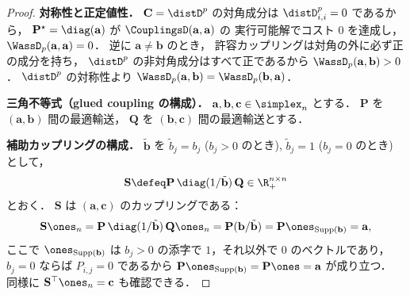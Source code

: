 \begin{proof}
  \textbf{対称性と正定値性．}
  $\mathbf{C} = \distD^p$ の対角成分は $\distD_{i,i}^p = 0$ であるから，
  $\mathbf{P}^\star = \diag(\mathbf{a})$ が $\CouplingsD(\mathbf{a}, \mathbf{a})$ の
  実行可能解でコスト $0$ を達成し，$\WassD_p(\mathbf{a}, \mathbf{a}) = 0$．
  逆に $\mathbf{a} \neq \mathbf{b}$ のとき，
  許容カップリングは対角の外に必ず正の成分を持ち，
  $\distD^p$ の非対角成分はすべて正であるから $\WassD_p(\mathbf{a}, \mathbf{b}) > 0$．
  $\distD^p$ の対称性より $\WassD_p(\mathbf{a}, \mathbf{b}) = \WassD_p(\mathbf{b}, \mathbf{a})$．

  \medskip
  \textbf{三角不等式（glued coupling の構成）．}
  $\mathbf{a}, \mathbf{b}, \mathbf{c} \in \simplex_n$ とする．
  $\mathbf{P}$ を $(\mathbf{a}, \mathbf{b})$ 間の最適輸送，
  $\mathbf{Q}$ を $(\mathbf{b}, \mathbf{c})$ 間の最適輸送とする．

  \textbf{補助カップリングの構成．}
  $\tilde{\mathbf{b}}$ を $\tilde{b}_j = b_j$ ($b_j > 0$ のとき),
  $\tilde{b}_j = 1$ ($b_j = 0$ のとき) として，
  \[
    \mathbf{S} \defeq \mathbf{P} \, \diag(1 / \tilde{\mathbf{b}}) \, \mathbf{Q}
    \in \R_+^{n \times n}
  \]
  とおく．
  $\mathbf{S}$ は $(\mathbf{a}, \mathbf{c})$ のカップリングである：
  \[
    \mathbf{S} \ones_n
    = \mathbf{P} \, \diag(1/\tilde{\mathbf{b}}) \, \mathbf{Q} \ones_n
    = \mathbf{P} (\mathbf{b} / \tilde{\mathbf{b}})
    = \mathbf{P} \ones_{\mathrm{Supp}(\mathbf{b})}
    = \mathbf{a},
  \]
  ここで $\ones_{\mathrm{Supp}(\mathbf{b})}$ は
  $b_j > 0$ の添字で $1$，それ以外で $0$ のベクトルであり，
  $b_j = 0$ ならば $P_{i,j} = 0$ であるから
  $\mathbf{P} \ones_{\mathrm{Supp}(\mathbf{b})} = \mathbf{P} \ones = \mathbf{a}$
  が成り立つ．
  同様に $\mathbf{S}^\top \ones_n = \mathbf{c}$ も確認できる．


\end{proof}
